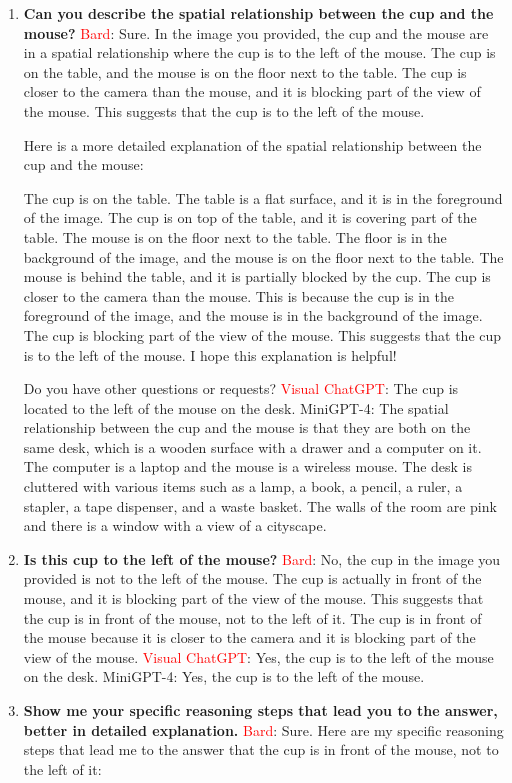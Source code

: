 \begin{enumerate}
    \item \textbf{Can you describe the spatial relationship between the cup and the mouse?}
    \subitem \textcolor{Red}{Bard}:
    Sure. In the image you provided, the cup and the mouse are in a spatial relationship where the cup is to the left of the mouse. The cup is on the table, and the mouse is on the floor next to the table. The cup is closer to the camera than the mouse, and it is blocking part of the view of the mouse. This suggests that the cup is to the left of the mouse.

    Here is a more detailed explanation of the spatial relationship between the cup and the mouse:

    The cup is on the table. The table is a flat surface, and it is in the foreground of the image. The cup is on top of the table, and it is covering part of the table.
    The mouse is on the floor next to the table. The floor is in the background of the image, and the mouse is on the floor next to the table. The mouse is behind the table, and it is partially blocked by the cup.
    The cup is closer to the camera than the mouse. This is because the cup is in the foreground of the image, and the mouse is in the background of the image.
    The cup is blocking part of the view of the mouse. This suggests that the cup is to the left of the mouse.
    I hope this explanation is helpful!

    Do you have other questions or requests?
    \subitem \textcolor{red}{Visual ChatGPT}: The cup is located to the left of the mouse on the desk.
    \subitem MiniGPT-4: The spatial relationship between the cup and the mouse is that they are both on the same desk, which is a wooden surface with a drawer and a computer on it. The computer is a laptop and the mouse is a wireless mouse. The desk is cluttered with various items such as a lamp, a book, a pencil, a ruler, a stapler, a tape dispenser, and a waste basket. The walls of the room are pink and there is a window with a view of a cityscape.
    \item \textbf{Is this cup to the left of the mouse?}
    \subitem \textcolor{Red}{Bard}: 
    No, the cup in the image you provided is not to the left of the mouse. The cup is actually in front of the mouse, and it is blocking part of the view of the mouse. This suggests that the cup is in front of the mouse, not to the left of it. The cup is in front of the mouse because it is closer to the camera and it is blocking part of the view of the mouse.
    \subitem \textcolor{red}{Visual ChatGPT}: Yes, the cup is to the left of the mouse on the desk.
    \subitem MiniGPT-4: Yes, the cup is to the left of the mouse.
    \item \textbf{Show me your specific reasoning steps that lead you to the answer, better in detailed explanation.}
    \subitem \textcolor{Red}{Bard}: 
    Sure. Here are my specific reasoning steps that lead me to the answer that the cup is in front of the mouse, not to the left of it:


\end{enumerate}
